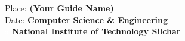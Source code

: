 Place: \hfill\textbf{(Your Guide Name)} \\
Date: \hfill\textbf{Computer Science \& Engineering}\\
\textcolor{white}{a} \hfill\textbf{National Institute of Technology Silchar} 




\newpage
\thispagestyle{empty}
\begin{center}
\small{\MakeUppercase{}}%
\end{center}
\clearpage
\newpage 